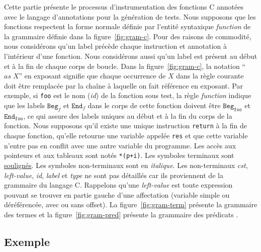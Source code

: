 Cette partie présente le processus d'instrumentation des fonctions C annotées
avec le langage d'annotations \eacsl pour la génération de tests.
Nous supposons que les fonctions respectent la forme normale définie par
l'entité syntaxique \textit{function} de la grammaire définie dans la
figure~\ref{fig:gram-c}.
Pour des raisons de commodité, nous considérons qu'un label précède chaque
instruction et annotation à l'intérieur d'une fonction.
Nous considérons aussi qu'un label est présent au début et à la fin de chaque
corps de boucle.
Dans la figure~\ref{fig:gram-c}, la notation ``${\textit{as}\;X}$'' en exposant
signifie que chaque occurrence de $X$ dans la règle courante doit être remplacée
par la chaîne à laquelle on fait référence en exposant.
Par exemple, si \texttt{foo} est le nom (\textit{id}) de la fonction sous test,
la règle \textit{function} indique que les labels $\texttt{Beg}_f$ et
$\texttt{End}_f$ dans le corps de cette fonction doivent être
$\texttt{Beg}_{\texttt{foo}}$ et $\texttt{End}_{\texttt{foo}}$, ce qui assure des
labels uniques au début et à la fin du corps de la fonction.
Nous supposons qu'il existe une unique instruction \lstinline'return' à la fin
de chaque fonction, qu'elle retourne une variable appelée \lstinline'res' et que
cette variable n'entre pas en conflit avec une autre variable du programme.
Les accès aux pointeurs et aux tableaux sont notés \lstinline|*(p+i)|.
Les symboles terminaux sont \underline{soulignés}.
Les symboles non-terminaux sont en \textit{italique}.
Les non-terminaux \textit{cst}, \textit{left-value}, \textit{id}, \textit{label}
et \textit{type} ne sont pas détaillés car ils proviennent de la grammaire du
langage C.
Rappelons qu'une \textit{left-value} est toute expression pouvant se trouver en
partie gauche d'une affectation (variable simple ou déréférencée, avec ou sans
offset).
La figure~\ref{fig:gram-term} présente la grammaire des termes \eacsl et la
figure~\ref{fig:gram-pred} présente la grammaire des prédicats \eacsl.


\subsection{Exemple}
\label{sec:translation-example}




